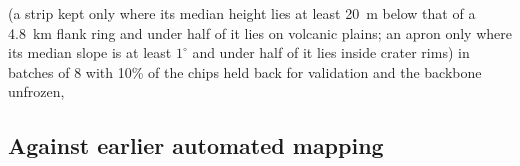 (a strip kept only where its median height lies at least 20~m below that of a 4.8~km flank ring and under half of it
lies on volcanic plains; an apron only where its median slope is at least $1^{\circ}$ and under half of it lies inside
crater rims)
in batches of 8 with 10\% of the chips held back for validation and the backbone unfrozen,

\subsection{Against earlier automated mapping}

